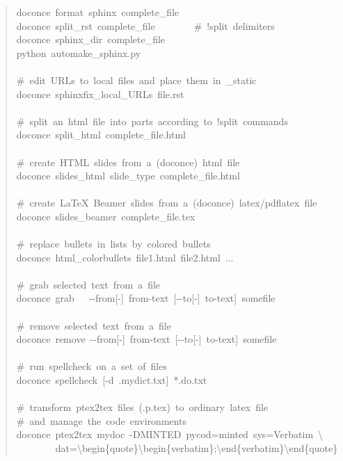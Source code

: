 \documentclass[a4paper]{article}
\begin{document}
\begin{quote}
{doconce~format~sphinx~complete\_file\\
doconce~split\_rst~complete\_file~~~~~~~~\#~!split~delimiters\\
doconce~sphinx\_dir~complete\_file\\
python~automake\_sphinx.py\\
~\\
\#~edit~URLs~to~local~files~and~place~them~in~\_static\\
doconce~sphinxfix\_local\_URLs~file.rst\\
~\\
\#~split~an~html~file~into~parts~according~to~!split~commands\\
doconce~split\_html~complete\_file.html\\
~\\
\#~create~HTML~slides~from~a~(doconce)~html~file\\
doconce~slides\_html~slide\_type~complete\_file.html\\
~\\
\#~create~LaTeX~Beamer~slides~from~a~(doconce)~latex/pdflatex~file\\
doconce~slides\_beamer~complete\_file.tex\\
~\\
\#~replace~bullets~in~lists~by~colored~bullets\\
doconce~html\_colorbullets~file1.html~file2.html~...\\
~\\
\#~grab~selected~text~from~a~file\\
doconce~grab~~~-{}-from{[}-{]}~from-text~{[}-{}-to{[}-{]}~to-text{]}~somefile\\
~\\
\#~remove~selected~text~from~a~file\\
doconce~remove~-{}-from{[}-{]}~from-text~{[}-{}-to{[}-{]}~to-text{]}~somefile\\
~\\
\#~run~spellcheck~on~a~set~of~files\\
doconce~spellcheck~{[}-d~.mydict.txt{]}~*.do.txt\\
~\\
\#~transform~ptex2tex~files~(.p.tex)~to~ordinary~latex~file\\
\#~and~manage~the~code~environments\\
doconce~ptex2tex~mydoc~-DMINTED~pycod=minted~sys=Verbatim~\textbackslash{}\\
~~~~~~~~dat=\textbackslash{}begin\{quote\}\textbackslash{}begin\{verbatim\};\textbackslash{}end\{verbatim\}\textbackslash{}end\{quote\}\\
}
\end{quote}
\end{document}
